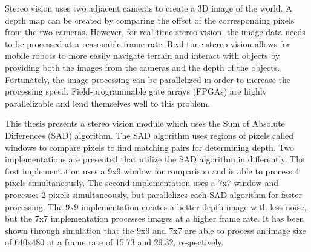 Stereo vision uses two adjacent cameras to create a 3D image of the world. A depth map can be created by comparing the offset of the corresponding pixels from the two cameras. However, for real-time stereo vision, the image data needs to be processed at a reasonable frame rate. Real-time stereo vision allows for mobile robots to more easily navigate terrain and interact with objects by providing both the images from the cameras and the depth of the objects. Fortunately, the image processing can be parallelized in order to increase the processing speed. Field-programmable gate arrays (FPGAs) are highly parallelizable and lend themselves well to this problem.

This thesis presents a stereo vision module which uses the Sum of Absolute Differences (SAD) algorithm. The SAD algorithm uses regions of pixels called windows to compare pixels to find matching pairs for determining depth. Two implementations are presented that utilize the SAD algorithm in differently. The first implementation uses a 9x9 window for comparison and is able to process 4 pixels simultaneously. The second implementation uses a 7x7 window and processes 2 pixels simultaneously, but parallelizes each SAD algorithm for faster processing. The 9x9 implementation creates a better depth image with less noise, but the 7x7 implementation processes images at a higher frame rate. It has been shown through simulation that the 9x9 and 7x7 are able to process an image size of 640x480 at a frame rate of 15.73 and 29.32, respectively.


%



